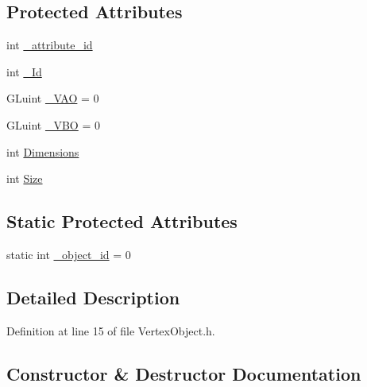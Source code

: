 \subsection*{Protected Attributes}
\begin{DoxyCompactItemize}
\item 
int \mbox{\hyperlink{classEngine_1_1Components_1_1Objects_1_1VertexObject_a401aa1eb0254e57d8295c2287749eed5}{\+\_\+attribute\+\_\+id}}
\item 
int \mbox{\hyperlink{classEngine_1_1Components_1_1Objects_1_1VertexObject_aa76ac755e9e37853a778795f0a0ad15e}{\+\_\+\+Id}}
\item 
G\+Luint \mbox{\hyperlink{classEngine_1_1Components_1_1Objects_1_1VertexObject_ae85ac9d5ded8f54d58feb7fb78e75130}{\+\_\+\+V\+AO}} = 0
\item 
G\+Luint \mbox{\hyperlink{classEngine_1_1Components_1_1Objects_1_1VertexObject_a79e171ffe4b9342d76c0c729a9836fd2}{\+\_\+\+V\+BO}} = 0
\item 
int \mbox{\hyperlink{classEngine_1_1Components_1_1Objects_1_1VertexObject_ae5bb104a878dc8a3c909ec9b0ee799c1}{Dimensions}}
\item 
int \mbox{\hyperlink{classEngine_1_1Components_1_1Objects_1_1VertexObject_a13ec6e4a92520bdd1b33ad6de757cb92}{Size}}
\end{DoxyCompactItemize}
\subsection*{Static Protected Attributes}
\begin{DoxyCompactItemize}
\item 
static int \mbox{\hyperlink{classEngine_1_1Components_1_1Objects_1_1VertexObject_aef076731df98a4806c644a3ac4400ae2}{\+\_\+object\+\_\+id}} = 0
\end{DoxyCompactItemize}


\subsection{Detailed Description}


Definition at line 15 of file Vertex\+Object.\+h.



\subsection{Constructor \& Destructor Documentation}
\mbox{\label{classEngine_1_1Components_1_1Objects_1_1VertexObject_a2cd67c7ea4baefd945c5045d2a775a5d}} 

